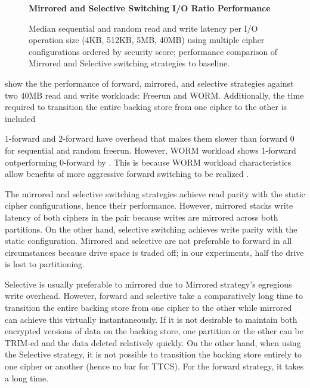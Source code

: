 \begin{figure}[ht]
   \textbf{Mirrored and Selective Switching I/O Ratio Performance}\par\medskip
   \centering
   {} \caption{Median sequential
   and random read and write latency per I/O operation size (4KB, 512KB, 5MB,
   40MB) using multiple cipher configurations ordered by security score;
   performance comparison of Mirrored and Selective switching strategies to
   baseline.}
  \label{fig:mirrored-selective-baseline}
\end{figure}

 show the the performance of forward,
mirrored, and selective strategies against two 40MB read and write workloads:
Freerun and WORM.  Additionally, the time
required to transition the entire backing store from one cipher to the other is
included 

1-forward and 2-forward have overhead that makes them slower than forward 0 for
sequential and random freerun. However, WORM workload shows 1-forward
outperforming 0-forward by . This is
because WORM workload characteristics allow benefits of more aggressive forward
switching to be realized .

The mirrored and selective switching strategies achieve read parity with the
static cipher configurations, hence their performance. However, mirrored stacks
write latency of both ciphers in the pair because writes are mirrored across
both partitions. On the other hand, selective switching achieves write parity
with the static configuration. Mirrored and selective are not preferable to
forward in all circumstances because drive space is traded off; in our
experiments, half the drive is lost to partitioning.


Selective is usually preferable to mirrored due to Mirrored strategy's egregious
write overhead. However, forward and selective take a comparatively long time to
transition the entire backing store from one cipher to the other while mirrored
can achieve this virtually instantaneously. If it is not desirable to maintain
both encrypted versions of data on the backing store, one partition or the other
can be TRIM-ed and the data deleted relatively quickly. On the other hand, when
using the Selective strategy, it is not possible to transition the backing store
entirely to one cipher or another (hence no bar for TTCS). For the forward
strategy, it takes a long time. 
